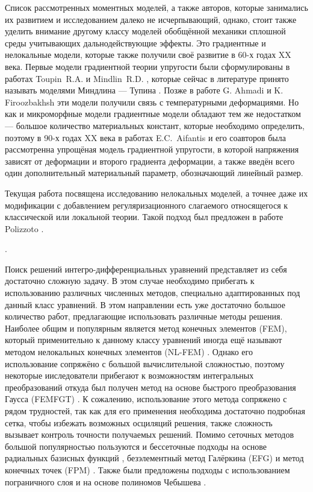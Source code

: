 Список рассмотренных моментных моделей, а также авторов, которые занимались их развитием и исследованием далеко не исчерпывающий, однако, стоит также уделить внимание другому классу моделей обобщённой механики сплошной среды учитывающих дальнодействующие эффекты. Это градиентные и нелокальные модели, которые также получили своё развитие в 60-х годах XX века. Первые модели градиентной теории упругости были сформулированы в работах Toupin~R.A. \cite{Toupin} и Mindlin~R.D. \cite{Mindlin4, Mindlin5}, которые сейчас в литературе принято называть моделями Миндлина --- Тупина \cite{ToupinMindlin1, ToupinMindlin2, ToupinMindlin3}. Позже в работе G. Ahmadi и K. Firoozbakhsh \cite{GradientThermoelasticity} эти модели получили связь с температурными деформациями. Но как и микроморфные модели градиентные модели обладают тем же недостатком --- большое количество материальных констант, которые необходимо определить, поэтому в 90-х годах XX века в работах E.C.~Aifantis и его соавторов \cite{Aifantis1, Aifantis2, Aifantis3} была рассмотренна упрощёная модель градиентной упругости, в которой напряжения зависят от деформации и второго градиента деформации, а также введён всего один дополнительный материальный параметр, обозначающий линейный размер.

Текущая работа посвящена исследованию нелокальных моделей, а точнее даже их модификации с добавлением регуляризационного слагаемого относящегося к классической или локальной теории. Такой подход был предложен в работе Polizzoto \cite{Polizzotto1}.

\cite{SaintVenant}.

Поиск решений интегро-дифференциальных уравнений представляет из себя достаточно сложную задачу. В этом случае необходимо прибегать к использованию различных численных методов, специально адаптированных под данный класс уравнений. В этом направлении есть уже достаточно большое количество работ, предлагающие использовать различные методы решения. Наиболее общим и популярным является метод конечных элементов (FEM), который применительно к данному классу уравнений иногда ещё называют методом нелокальных конечных элементов (NL-FEM) \cite{Polizzotto2, Pisano1}. Однако его использование сопряжёно с большой вычислительной сложностью, поэтому некоторые ииследователи прибегают к возможностям интегральных преобразований откуда был получен метод на основе быстрого преобразования Гаусса (FEMFGT) \cite{FastGaussTransform}. К сожалению, использование этого метода сопряжено с рядом трудностей, так как для его применения необходима достаточно подробная сетка, чтобы избежать возможных осциляций решения, также сложность вызывает контроль точности получаемых решений. Помимо сеточных методов большой популярностью пользуются и бессеточные подходы на основе радиальных базисных функций \cite{RadialBasis}, безэлементный метод Галёркина (EFG) и метод конечных точек (FPM) \cite{MeshFree}. Также были предложены подходы с использованием пограничного слоя \cite{BondaryLayer} и на основе полиномов Чебышева \cite{ChebPolynom}.

